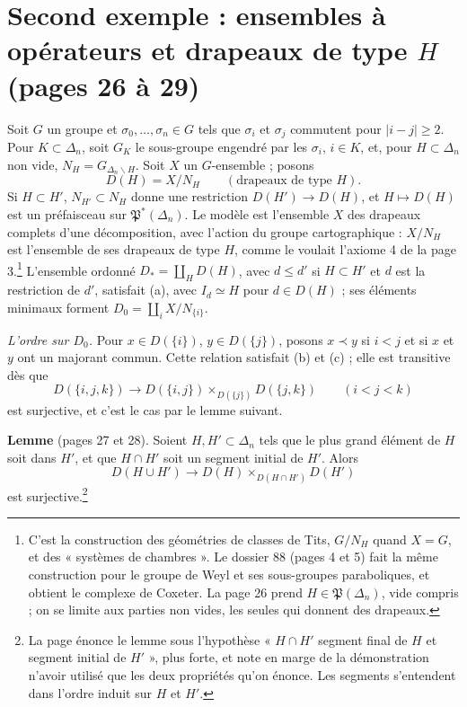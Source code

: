 \documentclass[11pt,a4paper]{article}
\begin{document}
\section*{Second exemple : ensembles à opérateurs et drapeaux de type $H$ (pages 26 à 29)}

Soit $G$ un groupe et $\sigma_0, \ldots, \sigma_n \in G$ tels que $\sigma_i$
et $\sigma_j$ commutent pour $|i - j| \geqslant 2$. Pour $K \subset \Delta_n$,
soit $G_K$ le sous-groupe engendré par les $\sigma_i$, $i \in K$, et, pour
$H \subset \Delta_n$ non vide, $N_H = G_{\Delta_n \smallsetminus H}$. Soit $X$
un $G$-ensemble ; posons
\[
  D(H) = X / N_H \qquad (\text{drapeaux de type } H) .
\]
Si $H \subset H'$, $N_{H'} \subset N_H$ donne une restriction $D(H') \to D(H)$,
et $H \mapsto D(H)$ est un préfaisceau sur $\mathfrak{P}^*(\Delta_n)$. Le
modèle est l'ensemble $X$ des drapeaux complets d'une décomposition, avec
l'action du groupe cartographique : $X/N_H$ est l'ensemble de ses drapeaux de
type $H$, comme le voulait l'axiome 4 de la page 3.\footnote{C'est la
construction des géométries de classes de Tits, $G/N_H$ quand $X = G$, et des
« systèmes de chambres ». Le dossier 88 (pages 4 et 5) fait la même
construction pour le groupe de Weyl et ses sous-groupes paraboliques, et
obtient le complexe de Coxeter. La page 26 prend $H \in \mathfrak{P}(\Delta_n)$,
vide compris ; on se limite aux parties non vides, les seules qui donnent des
drapeaux.} L'ensemble ordonné $D_* = \coprod_H D(H)$, avec $d \leqslant d'$ si
$H \subset H'$ et $d$ est la restriction de $d'$, satisfait (a), avec $I_d
\simeq H$ pour $d \in D(H)$ ; ses éléments minimaux forment $D_0 =
\coprod_i X/N_{\{i\}}$.

\emph{L'ordre sur $D_0$.} Pour $x \in D(\{i\})$, $y \in D(\{j\})$, posons $x
\prec y$ si $i < j$ et si $x$ et $y$ ont un majorant commun. Cette relation
satisfait (b) et (c) ; elle est transitive dès que
\[
  D(\{i, j, k\}) \longrightarrow D(\{i, j\}) \times_{D(\{j\})} D(\{j, k\})
  \qquad (i < j < k)
\]
est surjective, et c'est le cas par le lemme suivant.

\textbf{Lemme} (pages 27 et 28). Soient $H, H' \subset \Delta_n$ tels que le
plus grand élément de $H$ soit dans $H'$, et que $H \cap H'$ soit un segment
initial de $H'$. Alors
\[
  D(H \cup H') \longrightarrow D(H) \times_{D(H \cap H')} D(H')
\]
est surjective.\footnote{La page énonce le lemme sous l'hypothèse « $H \cap H'$
segment final de $H$ et segment initial de $H'$ », plus forte, et note en
marge de la démonstration n'avoir utilisé que les deux propriétés qu'on
énonce. Les segments s'entendent dans l'ordre induit sur $H$ et $H'$.}
\end{document}
